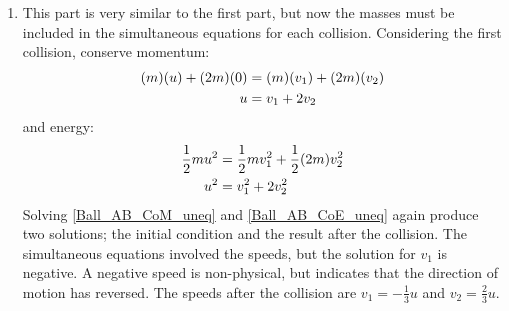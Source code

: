 \begin{problem}[A1969AMIIQ8l]
{\begin{enumerate}
We now have the three velocities:
\begin{align*}
 v_{1} = 0 && w_{2} = 0 && w_{3} = u 
\end{align*}
as the final velocities of the three balls.


	\item This part is very similar to the first part, but now the masses must be included in the simultaneous equations for each collision. Considering the first collision, conserve momentum:
\begin{align} \notag 
(m)(u) + (2m)(0) &= (m)(v_{1}) + (2m)(v_{2}) \\ 
u &= v_{1} + 2v_{2} \label{Ball_AB_CoM_uneq} 
\end{align}
and energy:
\begin{align} \notag 
\frac{1}{2}mu^{2} &= \frac{1}{2}mv_{1}^{2} + \frac{1}{2}(2m)v_{2}^{2} \\ 
u^{2} &= v_{1}^{2} + 2v_{2}^{2} \label{Ball_AB_CoE_uneq} 
\end{align}
Solving \ref{Ball_AB_CoM_uneq} and \ref{Ball_AB_CoE_uneq} again produce two solutions; the initial condition and the result after the collision. The simultaneous equations involved the speeds, but the solution for $v_{1}$ is negative. A negative speed is non-physical, but indicates that the direction of motion has reversed. The speeds after the collision are $v_{1} = - \frac{1}{3}u$ and $v_{2} = \frac{2}{3}u$.


\end{enumerate}}
\end{problem}
